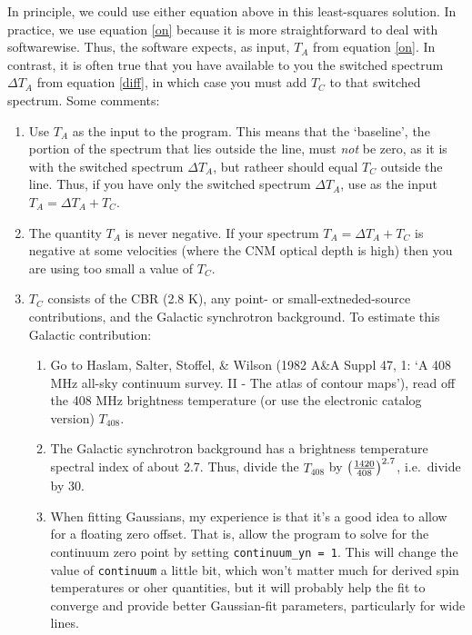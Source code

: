 \documentclass[preprint]{aastex}
\begin{document}
In principle, we could use either equation above in this least-squares
solution. In practice, we use equation \ref{on} because it is more
straightforward to deal with softwarewise. Thus, the software expects,
as input, $T_A$ from equation \ref{on}. In contrast, it is often true
that you have available to you the switched spectrum $\Delta T_A$ from
equation \ref{diff}, in which case you must add $T_C$ to that switched
spectrum.  Some comments: \begin{enumerate}

\item Use $T_A$ as the input to the program. This means that the
  `baseline', the portion of the spectrum that lies outside the line,
  must {\it not} be zero, as it is with the switched spectrum $\Delta
  T_A$, but ratheer should equal $T_C$ outside the line. Thus, if you
  have only the switched spectrum $\Delta T_A$, use as the input $T_A =
  \Delta T_A + T_C$. 

\item The quantity $T_A$ is never negative. If your spectrum $T_A =
  \Delta T_A + T_C$ is negative at some velocities (where the CNM
  optical depth is high) then you are using too small a value of $T_C$.

\item $T_C$ consists of the CBR (2.8 K), any point- or
  small-extneded-source contributions, and the Galactic synchrotron
  background. To estimate this Galactic contribution: \begin{enumerate}

\item Go to Haslam, Salter, Stoffel, \& Wilson (1982 A\&A Suppl 47, 1:
  `A 408 MHz all-sky continuum survey. II - The atlas of contour
  maps'), read off the 408 MHz brightness temperature (or use the
  electronic catalog version) $T_{408}$. 

\item The Galactic synchrotron background has a brightness temperature
  spectral index of about 2.7. Thus, divide the $T_{408}$ by $\left({1420
  \over 408}\right)^{2.7}$, i.e.\ divide by 30. 

\item When fitting Gaussians, my experience is that it's a good idea to
  allow for a floating zero offset. That is, allow the program to solve
  for the continuum zero point by setting {\tt continuum\_yn = 1}. This
  will change the value of {\tt continuum} a little bit, which won't
  matter much for derived spin temperatures or oher quantities, but it
  will probably help the fit to converge and provide better Gaussian-fit
  parameters, particularly for wide lines.


\end{enumerate}
\end{enumerate}
\end{document}
